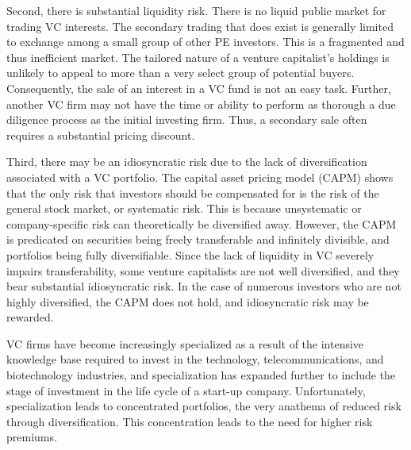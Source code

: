 \documentclass[11pt]{article}
\begin{document}
Second, there is substantial liquidity risk. There is no liquid public market for trading VC interests. The secondary trading that does exist is generally limited to exchange among a small group of other PE investors. This is a fragmented and thus inefficient market. The tailored nature of a venture capitalist's holdings is unlikely to appeal to more than a very select group of potential buyers. Consequently, the sale of an interest in a VC fund is not an easy task. Further, another VC firm may not have the time or ability to perform as thorough a due diligence process as the initial investing firm. Thus, a secondary sale often requires a substantial pricing discount.

Third, there may be an idiosyncratic risk due to the lack of diversification associated with a VC portfolio. The capital asset pricing model (CAPM) shows that the only risk that investors should be compensated for is the risk of the general stock market, or systematic risk. This is because unsystematic or company-specific risk can theoretically be diversified away. However, the CAPM is predicated on securities being freely transferable and infinitely divisible, and portfolios being fully diversifiable. Since the lack of liquidity in VC severely impairs transferability, some venture capitalists are not well diversified, and they bear substantial idiosyncratic risk. In the case of numerous investors who are not highly diversified, the CAPM does not hold, and idiosyncratic risk may be rewarded.

VC firms have become increasingly specialized as a result of the intensive knowledge base required to invest in the technology, telecommunications, and biotechnology industries, and specialization has expanded further to include the stage of investment in the life cycle of a start-up company. Unfortunately, specialization leads to concentrated portfolios, the very anathema of reduced risk through diversification. This concentration leads to the need for higher risk premiums.
\end{document}
